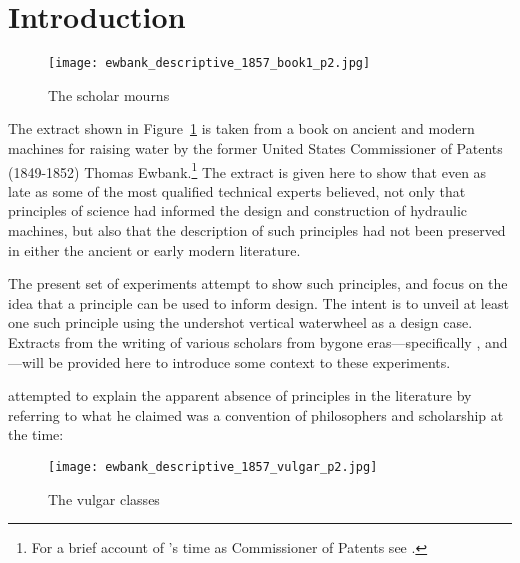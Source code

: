 \documentclass[a4paper, 12pt]{article}
\begin{document}
\newpage


\section{Introduction}

\begin{figure}[ht!]
    \centering
    \texttt{[image: ewbank\_descriptive\_1857\_book1\_p2.jpg]}
    \caption{The scholar mourns \cite[p.~2]{ewbank_descriptive_1857}}
    \label{fig:ewbank}
\end{figure}

The extract shown in Figure~\ref{fig:ewbank} is taken from a book on ancient and modern machines for raising water by the former United States Commissioner of Patents (1849-1852) Thomas Ewbank.\footnote{For a brief account of \citeauthor{ewbank_descriptive_1857}'s time as Commissioner of Patents see \cite{bate_thomas_1973}.} The extract is given here to show that even as late as \citeyear{ewbank_descriptive_1857} some of the most qualified technical experts believed, not only that principles of science had informed the design and construction of hydraulic machines, but also that the description of such principles had not been preserved in either the ancient or early modern literature.

The present set of experiments attempt to show such principles, and focus on the idea that a principle can be used to inform design. The intent is to unveil at least one such principle using the undershot vertical waterwheel as a design case. Extracts from the writing of various scholars from bygone eras---specifically \citeauthor{descartes_principles_1982}, \citeauthor{smeaton_experimental_1759} and \citeauthor{ewbank_descriptive_1857}---will be provided here to introduce some context to these experiments.



\citeauthor{ewbank_descriptive_1857} attempted to explain the apparent absence of principles in the literature by referring to what he claimed was a convention of philosophers and scholarship at the time:

\begin{figure}[ht!]
    \centering
    \texttt{[image: ewbank\_descriptive\_1857\_vulgar\_p2.jpg]}
    \caption{The vulgar classes \cite[p.~2]{ewbank_descriptive_1857}}
    \label{fig:ewbank:vulgar}
\end{figure}
\end{document}
